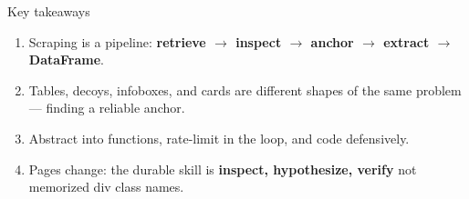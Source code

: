 \documentclass[9pt,aspectratio=169]{beamer}
\begin{document}
\begin{frame}{Key takeaways}
    \begin{enumerate}
        \item Scraping is a pipeline: \textbf{retrieve $\rightarrow$ inspect $\rightarrow$ anchor $\rightarrow$ extract $\rightarrow$ DataFrame}.
        \item Tables, decoys, infoboxes, and cards are different shapes of the same problem --- finding a reliable anchor.
        \item Abstract into functions, rate-limit in the loop, and code defensively.
        \item Pages change: the durable skill is \textbf{inspect, hypothesize, verify} not memorized div class names.
    \end{enumerate}
    \bigskip
\end{frame}
\end{document}

